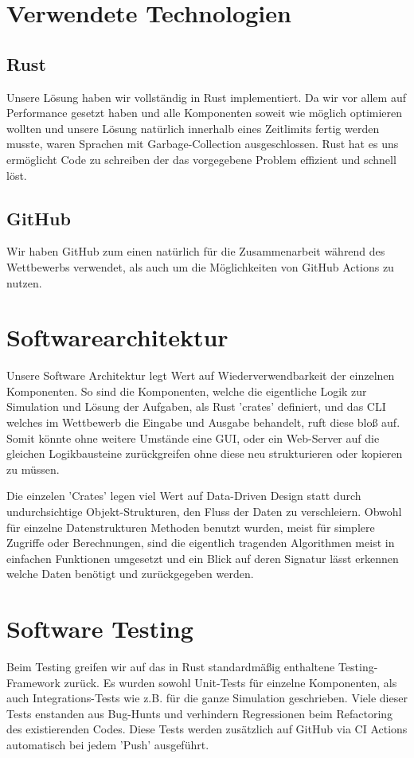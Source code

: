\documentclass[12pt,a4paper]{article}
\begin{document}
\section{Verwendete Technologien}

\subsection{Rust}
Unsere Lösung haben wir vollständig in Rust implementiert. Da wir vor allem auf Performance gesetzt haben und alle Komponenten soweit wie möglich optimieren wollten und unsere Lösung  natürlich innerhalb eines Zeitlimits fertig werden musste, waren Sprachen mit Garbage-Collection ausgeschlossen. Rust hat es uns ermöglicht Code zu schreiben der das vorgegebene Problem effizient und schnell löst.

\subsection{GitHub}
Wir haben GitHub zum einen natürlich für die Zusammenarbeit während des Wettbewerbs verwendet, als auch um die Möglichkeiten von GitHub Actions zu nutzen.


\section{Softwarearchitektur}
Unsere Software Architektur legt Wert auf Wiederverwendbarkeit der einzelnen Komponenten. So sind die Komponenten, welche die eigentliche Logik zur Simulation und Lösung der Aufgaben, als Rust 'crates' definiert, und das CLI welches im Wettbewerb die Eingabe und Ausgabe behandelt, ruft diese bloß auf. Somit könnte ohne weitere Umstände eine GUI, oder ein Web-Server auf die gleichen Logikbausteine zurückgreifen ohne diese neu strukturieren oder kopieren zu müssen.

Die einzelen 'Crates' legen viel Wert auf Data-Driven Design statt durch undurchsichtige Objekt-Strukturen, den Fluss der Daten zu verschleiern. Obwohl für einzelne Datenstrukturen Methoden benutzt wurden, meist für simplere Zugriffe oder Berechnungen, sind die eigentlich tragenden Algorithmen meist in einfachen Funktionen umgesetzt und ein Blick auf deren Signatur lässt erkennen welche Daten benötigt und zurückgegeben werden.

\section{Software Testing}
Beim Testing greifen wir auf das in Rust standardmäßig enthaltene Testing-Framework zurück. Es wurden sowohl Unit-Tests für einzelne Komponenten, als auch Integrations-Tests wie z.B. für die ganze Simulation geschrieben. Viele dieser Tests enstanden aus Bug-Hunts und verhindern Regressionen beim Refactoring des existierenden Codes. Diese Tests werden zusätzlich auf GitHub via CI Actions automatisch bei jedem 'Push' ausgeführt.
\end{document}
